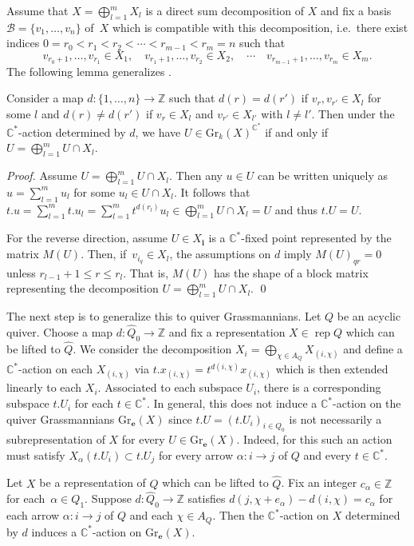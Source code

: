 \documentclass[smallextended,envcountsect,envcountsame]{svjour3}
\numberwithin{equation}{section}
\newcommand{\C}{\mathbb{C}}
\newcommand{\CC}{\mathbb{C}}
\newcommand{\ZZ}{\mathbb{Z}}
\newcommand{\bfe}{\mathbf{e}}
\newcommand{\bfi}{\mathbf{i}}
\newcommand{\Gr}{\mathrm{Gr}}
\newcommand{\rep}{\operatorname{rep}}
\begin{document}
Assume that $X=\bigoplus_{l=1}^m X_l$ is a direct sum decomposition of $X$ and fix a basis $\mathcal B=\{v_1,\ldots,v_n\}$ of~$X$ which is compatible with this decomposition, i.e.\ there exist indices $0=r_0<r_1<r_2<\cdots<r_{m-1}<r_m=n$ such that
\[v_{r_0+1},\ldots,v_{r_1}\in X_1,\quad v_{r_1+1},\ldots,v_{r_2}\in X_2,\quad\cdots\quad v_{r_{m-1}+1},\ldots,v_{r_m}\in X_m.\]
The following lemma generalizes \cite[Theorem 1]{cerulli}.
\begin{lemma}
  \label{le:usualGrass}
  Consider a map $d:\{1,\ldots,n\}\to\ZZ$ such that $d(r)=d(r')$ if $v_r,v_{r'}\in X_l$ for some $l$ and $d(r)\neq d(r')$ if $v_r\in X_l$ and $v_{r'}\in X_{l'}$ with $l\neq l'$.
  Then under the $\CC^*$-action determined by $d$, we have $U\in\Gr_k(X)^{\C^\ast}$ if and only if $U=\bigoplus_{l=1}^m U\cap X_l$.
\end{lemma}
\begin{proof}
  Assume $U=\bigoplus_{l=1}^m U\cap X_l$.
  Then any $u\in U$ can be written uniquely as $u=\sum_{l=1}^m u_l$ for some $u_l\in U\cap X_l$.
  It follows that $t.u=\sum_{l=1}^m t.u_l=\sum_{l=1}^m t^{d(r_l)}u_l\in\bigoplus_{l=1}^m U\cap X_l=U$ and thus $t.U=U$. 

  For the reverse direction, assume $U\in X_{\bfi}$ is a $\CC^*$-fixed point represented by the matrix $M(U)$.
  Then, if~$v_{i_q}\in X_l$, the assumptions on $d$ imply $M(U)_{qr}=0$ unless $r_{l-1}+1\le r\le r_l$.
  That is, $M(U)$ has the shape of a block matrix representing the decomposition $U=\bigoplus_{l=1}^m U\cap X_l$.
\qed\end{proof}
The next step is to generalize this to quiver Grassmannians.
Let $Q$ be an acyclic quiver.
Choose a map $d:\hat Q_0\to\ZZ$ and fix a representation $X\in\rep Q$ which can be lifted to $\hat Q$.
We consider the decomposition $X_i=\bigoplus_{\chi\in A_Q} X_{(i,\chi)}$ and define a $\CC^*$-action on each $X_{(i,\chi)}$ via $t.x_{(i,\chi)}=t^{d(i,\chi)}x_{(i,\chi)}$ which is then extended linearly to each $X_i$.
Associated to each subspace $U_i$, there is a corresponding subspace $t.U_i$ for each $t\in\CC^*$.
In general, this does not induce a $\CC^*$-action on the quiver Grassmannians $\Gr_\bfe(X)$ since $t.U=(t.U_i)_{i\in Q_0}$ is not necessarily a subrepresentation of $X$ for every $U\in\Gr_\bfe(X)$.
Indeed, for this such an action must satisfy $X_\alpha(t.U_i)\subset t.U_j$ for every arrow $\alpha:i\to j$ of $Q$ and every $t\in\CC^*$. 
\begin{lemma}
  Let $X$ be a representation of $Q$ which can be lifted to $\hat Q$.
  Fix an integer $c_\alpha\in\ZZ$ for each~$\alpha\in Q_1$.
  Suppose $d:\hat Q_0\to\ZZ$ satisfies $d(j,\chi+e_\alpha)-d(i,\chi)=c_\alpha$ for each arrow $\alpha:i\to j$ of $Q$ and each $\chi\in A_Q$.
  Then the $\CC^*$-action on $X$ determined by $d$ induces a $\CC^*$-action on $\Gr_\bfe(X)$.
\end{lemma}
\end{document}
